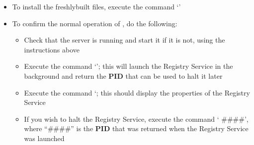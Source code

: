 \begin{itemize}
\begin{itemize}
\begin{verbatim}
  | |/ ___ \|  _ <|  __/ 
  |_/_/   \_\_| \_\_|    
\end{verbatim}
Call with \longDash{}help for information on available options\\
Options can be set on command line or in /Users/M\textunderscore{}M/Library/Application\\
\hspace*{5em}Support/yarp/config/yarpserver.conf\\
Using port database:\ :memory:\\
Using subscription database:\ :memory:\\
IP address:\ default\\
Port number:\ 10000\\
yarp:\ Port /root failed to activate at tcp://10.0.1.2:10000 (address conflict)\\
Name server failed to open
\outputEnd{}
\item\exSp{} If you see the above error message, you will need to clear the \yarp{}
configuration by issuing the command `'.
\item\exSp{} Once the \yarp{} configuration is cleared, execute the command
`' to start the \yarp{}
server, where `' is an arbitrary number greater than 1024.
\item\exSp{} In the terminal session where \mplusm{} was built, execute the command
`'
\item\exSp{} When the test completes, close the new terminal session if one was started
for the test
\end{itemize}
\item\exSp{} To install the freshly\longDash{}built \mplusm{} files, execute the command
`'
\item\exSp{} To confirm the normal operation of \mplusm{}, do the following:
\begin{itemize}
\item Check that the \yarp{} server is running and start it if it is not, using the
instructions above
\item\exSp{} Execute the command `'; this will launch the
Registry Service in the background and return the \textbf{PID} that can be used to halt it
later
\item\exSp{} Execute the command `; this should display the
properties of the Registry Service
\item\exSp{} If you wish to halt the Registry Service, execute the command
`
\#\#\#\#', where ``\#\#\#\#'' is the \textbf{PID} that was returned when the Registry
Service was launched
\end{itemize}
\end{itemize}

